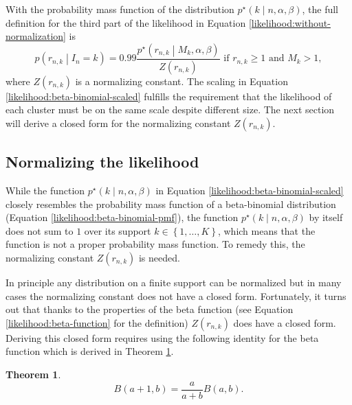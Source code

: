 \documentclass[officiallayout]{tktla}
\newtheorem{theorem}{Theorem}[chapter]
\begin{document}
With the probability mass function of the distribution
$p^{\star}\left(k \middle| n, \alpha, \beta\right)$, the full
definition for the third part of the likelihood in Equation \ref{likelihood:without-normalization} is
\begin{equation}
  \label{likelihood:normalized}
  p\left(r_{n, k} \middle| I_{n} = k\right) = 0.99\frac{p^{\star}\left(r_{n, k} \middle| M_{k}, \alpha, \beta\right)}{Z\left(r_{n, k}\right)}\text{ if } r_{n, k} \geq 1\text{ and } M_{k} > 1,
\end{equation}
where $Z\left(r_{n, k}\right)$ is a normalizing constant. The scaling
in Equation \ref{likelihood:beta-binomial-scaled} fulfills the
requirement that the likelihood of each cluster must be on the same
scale despite different size. The next section will derive a closed
form for the normalizing constant $Z\left(r_{n, k}\right)$.

\subsection{Normalizing the likelihood}

While the function $p^{\star}\left(k \middle| n, \alpha, \beta\right)$
in Equation \ref{likelihood:beta-binomial-scaled} closely resembles
the probability mass function of a beta-binomial distribution
(Equation \ref{likelihood:beta-binomial-pmf}), the function
$p^{\star}\left(k \middle| n, \alpha, \beta\right)$ by itself does not
sum to $1$ over its support $k \in \left\{ 1, \dots, K \right\}$,
which means that the function is not a proper probability mass
function. To remedy this, the normalizing constant $Z\left(r_{n,
  k}\right)$ is needed.

In principle any distribution on a finite support can be normalized
but in many cases the normalizing constant does not have a closed
form. Fortunately, it turns out that \textemdash{ } thanks to the
properties of the beta function (see Equation
\ref{likelihood:beta-function} for the definition) \textemdash{ }
$Z\left(r_{n, k}\right)$ does have a closed form. Deriving this closed
form requires using the following identity for the beta function which
is derived in Theorem \ref{lemma:beta-function-identity}.
\begin{theorem}
  \label{lemma:beta-function-identity}
  \[
  B\left(a + 1, b\right) = \frac{a}{a + b}B\left(a, b\right).
  \]
\end{theorem}
\end{document}
